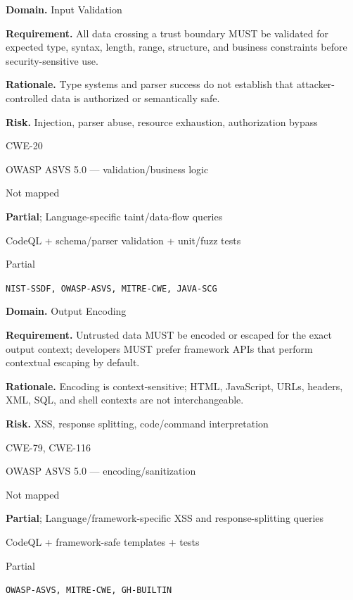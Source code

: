 \documentclass[10pt,letterpaper]{article}
\newcommand{\prioritybadge}[2]{\tcbox[on line,boxrule=0pt,arc=1.2mm,boxsep=0.7mm,left=1mm,right=1mm,top=0.4mm,bottom=0.4mm,colback=#2!12,coltext=#2]{\scriptsize\bfseries #1}}
\begin{document}
\begin{rulebox}[title={\texttt{SCS-ALL-INPUT-001} \hfill \prioritybadge{High Priority}{High}}]
\textbf{Domain.} Input Validation

\textbf{Requirement.} All data crossing a trust boundary MUST be validated for expected type, syntax, length, range, structure, and business constraints before security-sensitive use.

\textbf{Rationale.} Type systems and parser success do not establish that attacker-controlled data is authorized or semantically safe.

\textbf{Risk.} Injection, parser abuse, resource exhaustion, authorization bypass

\begin{description}[leftmargin=2.65cm,labelwidth=2.3cm,style=nextline,itemsep=1pt,topsep=3pt]
  \item[CWE] CWE-20
  \item[OWASP] OWASP ASVS 5.0 --- validation/business logic
  \item[CERT] Not mapped
  \item[CodeQL] \textbf{Partial}; Language-specific taint/data-flow queries
  \item[Enforcement] CodeQL + schema/parser validation + unit/fuzz tests
  \item[Automation] Partial
  \item[Sources] \texttt{NIST-SSDF, OWASP-ASVS, MITRE-CWE, JAVA-SCG}
\end{description}
\end{rulebox}

\begin{rulebox}[title={\texttt{SCS-ALL-OUTPUT-001} \hfill \prioritybadge{High Priority}{High}}]
\textbf{Domain.} Output Encoding

\textbf{Requirement.} Untrusted data MUST be encoded or escaped for the exact output context; developers MUST prefer framework APIs that perform contextual escaping by default.

\textbf{Rationale.} Encoding is context-sensitive; HTML, JavaScript, URLs, headers, XML, SQL, and shell contexts are not interchangeable.

\textbf{Risk.} XSS, response splitting, code/command interpretation

\begin{description}[leftmargin=2.65cm,labelwidth=2.3cm,style=nextline,itemsep=1pt,topsep=3pt]
  \item[CWE] CWE-79, CWE-116
  \item[OWASP] OWASP ASVS 5.0 --- encoding/sanitization
  \item[CERT] Not mapped
  \item[CodeQL] \textbf{Partial}; Language/framework-specific XSS and response-splitting queries
  \item[Enforcement] CodeQL + framework-safe templates + tests
  \item[Automation] Partial
  \item[Sources] \texttt{OWASP-ASVS, MITRE-CWE, GH-BUILTIN}
\end{description}
\end{rulebox}
\end{document}
